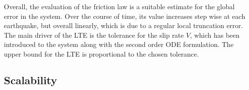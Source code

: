 Overall, the evaluation of the friction law is a suitable estimate for the global error in the system. Over the course of time, its value increases step wise at each earthquake, but overall linearly, which is due to a regular local truncation error. The main driver of the LTE is the tolerance for the slip rate $V$, which has been introduced to the system along with the second order ODE formulation. The upper bound for the LTE is proportional to the chosen tolerance.

\subsection{Scalability}


